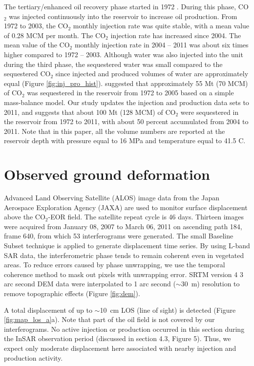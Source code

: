 The tertiary/enhanced oil recovery phase started in 1972 \cite[]{crameik1972carbon}.  During this phase, CO$_{2}$ was injected continuously into the reservoir to increase oil production.  From 1972 to 2003, the CO$_{2}$ monthly injection rate was quite stable, with a mean value of 0.28 MCM per month.  The CO$_{2}$ injection rate has increased since 2004.  The mean value of the CO$_{2}$ monthly injection rate in 2004 – 2011 was about six times higher compared to 1972 – 2003.  Although water was also injected into the unit during the third phase, the sequestered water was small compared to the sequestered CO$_{2}$ since injected and produced volumes of water are approximately equal (Figure \ref{fig:inj_pro_hist}).  \citet{raines66} suggested that approximately 55 Mt (70 MCM) of CO$_{2}$ was sequestered in the reservoir from 1972 to 2005 based on a simple mass-balance model.  Our study updates the injection and production data sets to 2011, and suggests that about 100 Mt (128 MCM) of CO$_{2}$ were sequestered in the reservoir from 1972 to 2011, with about 50 percent accumulated from 2004 to 2011. Note that in this paper, all the volume numbers are reported at the reservoir depth with pressure equal to 16 MPa and temperature equal to 41.5 \textordmasculine C.  

\section{Observed ground deformation}
Advanced Land Observing Satellite (ALOS) image data from the Japan Aerospace Exploration Agency (JAXA) are used to monitor surface displacement above the CO$_{2}$-EOR field.  The satellite repeat cycle is 46 days.  Thirteen images were acquired from January 08, 2007 to March 06, 2011 on ascending path 184, frame 640, from which 53 interferograms were generated.  The small Baseline Subset technique \cite[]{berardino2002new} is applied to generate displacement time series.  By using L-band SAR data, the interferometric phase tends to remain coherent even in vegetated areas. To reduce errors caused by phase unwrapping, we use the temporal coherence method \cite[]{pepe2006extension} to mask out pixels with unwrapping error.  SRTM version 4 \cite[]{reuter2007evaluation} 3 arc second DEM data were interpolated to 1 arc second ($\sim$30~m) resolution to remove topographic effects (Figure \ref{fig:dem}). 

A total displacement of up to $\sim$10~cm LOS (line of sight) is detected (Figure \ref{fig:map_los_a}a).  Note that part of the oil field is not covered by our interferograms.  No active injection or production occurred in this section during the InSAR observation period (discussed in section 4.3, Figure 5).  Thus, we expect only moderate displacement here associated with nearby injection and production activity.   

